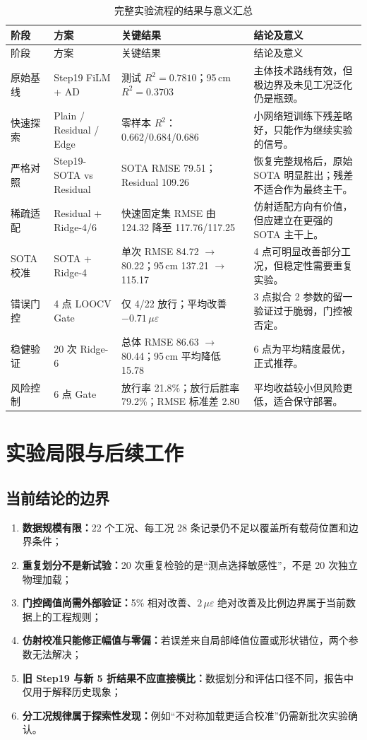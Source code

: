\documentclass[11pt,a4paper]{article}
\newcommand{\ue}{\,\mu\varepsilon}
\begin{document}
\small
\begin{longtable}{@{}C{15mm} C{22mm} C{28mm} p{65mm}@{}}
\caption{完整实验流程的结果与意义汇总}
\label{tab:summary}\\
\toprule
阶段 & 方案 & 关键结果 & 结论及意义\\
\midrule
\endfirsthead
\toprule
阶段 & 方案 & 关键结果 & 结论及意义\\
\midrule
\endhead
原始基线 & Step19 FiLM + AD & 测试 $R^2=0.7810$；95\,cm $R^2=0.3703$ & 主体技术路线有效，但极边界及未见工况泛化仍是瓶颈。\\
\midrule
快速探索 & Plain / Residual / Edge & 零样本 $R^2$：0.662/0.684/0.686 & 小网络短训练下残差略好，只能作为继续实验的信号。\\
\midrule
严格对照 & Step19-SOTA vs Residual & SOTA RMSE 79.51；Residual 109.26 & 恢复完整规格后，原始 SOTA 明显胜出；残差不适合作为最终主干。\\
\midrule
稀疏适配 & Residual + Ridge-4/6 & 快速固定集 RMSE 由 124.32 降至 117.76/117.25 & 仿射适配方向有价值，但应建立在更强的 SOTA 主干上。\\
\midrule
SOTA 校准 & SOTA + Ridge-4 & 单次 RMSE 84.72 $\rightarrow$ 80.22；95\,cm 137.21 $\rightarrow$ 115.17 & 4 点可明显改善部分工况，但稳定性需要重复实验。\\
\midrule
错误门控 & 4 点 LOOCV Gate & 仅 4/22 放行；平均改善 $-0.71\ue$ & 3 点拟合 2 参数的留一验证过于脆弱，门控被否定。\\
\midrule
稳健验证 & 20 次 Ridge-6 & 总体 RMSE 86.63 $\rightarrow$ 80.44；95\,cm 平均降低 15.78 & 6 点为平均精度最优，正式推荐。\\
\midrule
风险控制 & 6 点 Gate & 放行率 21.8\%；放行后胜率 79.2\%；RMSE 标准差 2.80 & 平均收益较小但风险更低，适合保守部署。\\
\bottomrule
\end{longtable}

\section{实验局限与后续工作}

\subsection{当前结论的边界}

\begin{enumerate}
  \item \textbf{数据规模有限：}22 个工况、每工况 28 条记录仍不足以覆盖所有载荷位置和边界条件；
  \item \textbf{重复划分不是新试验：}20 次重复检验的是“测点选择敏感性”，不是 20 次独立物理加载；
  \item \textbf{门控阈值尚需外部验证：}5\% 相对改善、$2\ue$ 绝对改善及比例边界属于当前数据上的工程规则；
  \item \textbf{仿射校准只能修正幅值与零偏：}若误差来自局部峰值位置或形状错位，两个参数无法解决；
  \item \textbf{旧 Step19 与新 5 折结果不应直接横比：}数据划分和评估口径不同，报告中仅用于解释历史现象；
  \item \textbf{分工况规律属于探索性发现：}例如“不对称加载更适合校准”仍需新批次实验确认。
\end{enumerate}
\end{document}
